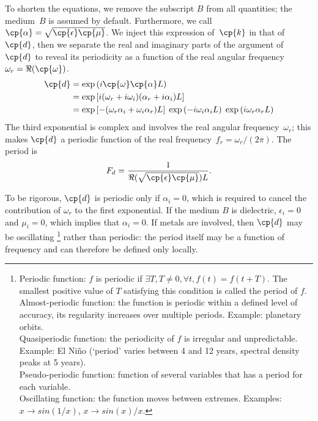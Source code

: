 \begin{refsection}
To shorten the equations, we remove the subscript $B$ from all quantities; the medium~$B$ is assumed by default.
Furthermore, we call~$\cp{\alpha}=\sqrt{\cp{\epsilon} \cp{\mu}}$.
We inject this expression of~$\cp{k}$ in that of~$\cp{d}$, then we separate the real and imaginary parts of the argument of~$\cp{d}$ to reveal its periodicity as a function of the real angular frequency~$\omega_r = \Re(\cp{\omega})$.
\begin{subequations}
    \label{eq:distance_coefficient_expanded}
    \begin{align}
        \cp{d}
        &=
        \exp \left( i \cp{\omega} \cp{\alpha} L \right)
        \\
        &=
        \exp
        \left[
            i
            (\omega_r + i \omega_i) (\alpha_r + i \alpha_i)
            L
        \right]
        \\
        &=
        \exp
        \left[
            -
            (\omega_r \alpha_i + \omega_i \alpha_r)
            L
        \right]
        \;
        \exp
        \left(
            -i \omega_i \alpha_i L
        \right)
        \;
        \exp
        \left(
            i \omega_r \alpha_r L
        \right)
    \end{align}
\end{subequations}
The third exponential is complex and involves the real angular frequency~$\omega_r$;
this makes $\cp{d}$ a periodic function of the real frequency~$f_r=\omega_r/(2\pi)$.
The period is
\begin{equation}
    F_d = 
    \frac{1}{\Re(\sqrt{\cp{\epsilon}\cp{\mu}})L}
    \text{.}
\end{equation}

To be rigorous, $\cp{d}$ is periodic only if $\alpha_i=0$, which is required to cancel the contribution of $\omega_r$ to the first exponential.
If the medium $B$ is dielectric, $\epsilon_i=0$ and $\mu_i=0$, which implies that $\alpha_i=0$.
If metals are involved, then $\cp{d}$ may be oscillating%
\footnote{
Periodic function: $f$ is periodic if $\exists T, T \ne 0, \forall t, f(t)=f(t+T)$.  The smallest positive value of $T$ satisfying this condition is called the period of $f$.\\
Almost-periodic function: the function is periodic within a defined level of accuracy, its regularity increases over multiple periods.  Example: planetary orbits.\\
Quasiperiodic function: the periodicity of $f$ is irregular and unpredictable.  Example: El Ni\~no (`period' varies between 4 and 12 years, spectral density peaks at 5 years).\\
Pseudo-periodic function: function of several variables that has a period for each variable.\\
Oscillating function: the function moves between extremes.  Examples: $x \rightarrow sin(1/x)$, $x \rightarrow sin(x)/x$.
}
rather than periodic: the period itself may be a function of frequency and can therefore be defined only locally.




\end{refsection}
